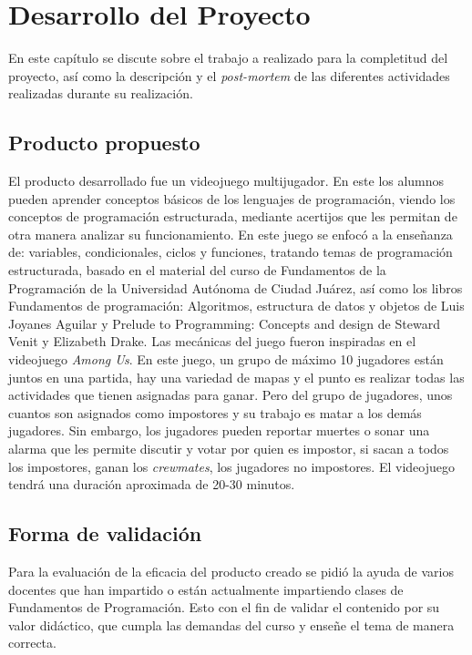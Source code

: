 \chapter{Desarrollo del Proyecto}
En este capítulo se discute sobre el trabajo a realizado para la completitud del proyecto, así como la descripción y el \textit{post-mortem} de las diferentes actividades realizadas durante su realización.

\section{Producto propuesto}
El producto desarrollado fue un videojuego multijugador. En este los alumnos pueden aprender conceptos básicos de los lenguajes de programación, viendo los conceptos de programación estructurada, mediante acertijos que les permitan de otra manera analizar su funcionamiento. En este juego se enfocó a la enseñanza de: variables, condicionales, ciclos y funciones, tratando temas de programación estructurada, basado en el material del curso de Fundamentos de la Programación de la Universidad Autónoma de Ciudad Juárez, así como los libros Fundamentos de programación: Algoritmos, estructura de datos y objetos de Luis Joyanes Aguilar y Prelude to Programming: Concepts and design de Steward Venit y Elizabeth Drake. 
Las mecánicas del juego fueron inspiradas en el videojuego \textit{Among Us}. En este juego, un grupo de máximo 10 jugadores están juntos en una partida, hay una variedad de mapas y el punto es realizar todas las actividades que tienen asignadas para ganar. Pero del grupo de jugadores, unos cuantos son asignados como impostores y su trabajo es matar a los demás jugadores. Sin embargo, los jugadores pueden reportar muertes o sonar una alarma que les permite discutir y votar por quien es impostor, si sacan a todos los impostores, ganan los \textit{crewmates}, los jugadores no impostores.
El videojuego tendrá una duración aproximada de 20-30 minutos.

\section{Forma de validación}
Para la evaluación de la eficacia del producto creado se pidió la ayuda de varios docentes que han impartido o están actualmente impartiendo clases de Fundamentos de Programación. Esto con el fin de validar el contenido por su valor didáctico, que cumpla las demandas del curso y enseñe el tema de manera correcta.

